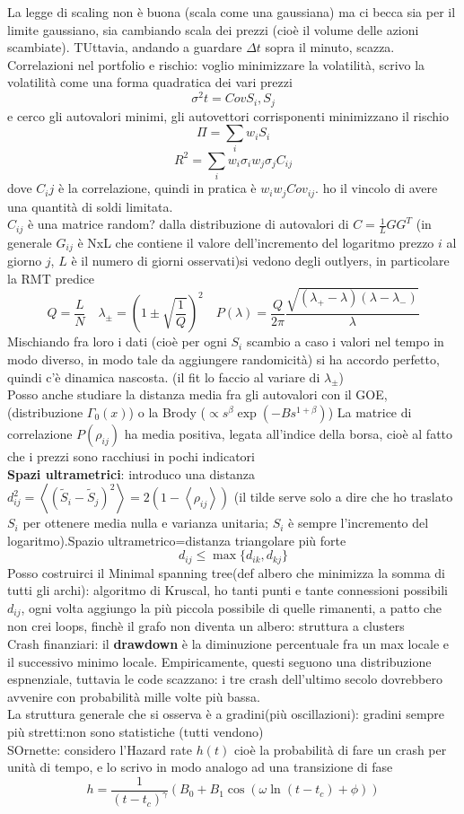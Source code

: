 \documentclass[a4paper,12pt]{article}
\theoremstyle{plain}
\theoremstyle{definition}
\newcommand{\f}[2]{\frac{#1}{#2}}
\newcommand{\ave}[1]{\left\langle#1\right\rangle }
\theoremstyle{remark}
\begin{document}
La legge di scaling non è buona  (scala come una gaussiana) ma ci becca sia per il limite gaussiano, sia cambiando scala dei prezzi (cioè il volume delle azioni scambiate). TUttavia, andando a guardare $\Delta t$ sopra il minuto, scazza.
\\Correlazioni nel portfolio e rischio: voglio minimizzare la volatilità, scrivo la volatilità come una forma quadratica dei vari prezzi
\[\sigma^2 t=Cov{S_i,S_j}\]
e cerco gli autovalori minimi, gli autovettori corrisponenti minimizzano il rischio
\[\Pi =\sum_i	w_i S_i		\] 
\[R^2=\sum_i	w_i \sigma_i w_j \sigma_j C_{ij}	\]
dove $C_ij$ è la correlazione, quindi in pratica è $w_i w_j Cov_{ij}$. ho il vincolo di avere una quantità di soldi limitata.\\ 
$C_{ij}$ è una matrice random? dalla distribuzione di autovalori di $C=\f{1}{L}G G^T$ (in generale $G_{ij}$ è NxL che contiene il valore dell'incremento del logaritmo prezzo $i$ al giorno $j$, $L$ è il numero di giorni osservati)si vedono degli outlyers, in particolare la RMT predice
\[Q=\f{L}{N}\quad\lambda_{\pm}=\left(1\pm\sqrt{\f{1}{Q}}\right)^2 \quad P(\lambda)=\f{Q}{2\pi}\f{\sqrt{(\lambda_{+}-\lambda)(\lambda-\lambda_-)}}{\lambda}			\]
Mischiando fra loro i dati (cioè per ogni $S_i$ scambio a caso i valori nel tempo in modo diverso, in modo tale da aggiungere randomicità) si ha accordo perfetto, quindi c'è dinamica nascosta. (il fit lo faccio al variare di $\lambda_\pm$)
\\Posso anche studiare la distanza media fra gli autovalori con il GOE, (distribuzione $\Gamma_0(x)$) o la Brody ($\propto s^\beta\exp(-Bs^{1+\beta})$)
La matrice di correlazione $P(\rho_{ij})$ ha media positiva, legata all'indice della borsa, cioè al fatto che i prezzi sono racchiusi in pochi indicatori
	\\\textbf{Spazi ultrametrici}: introduco una distanza $d_{ij}^2=\ave{(\tilde{S}_i-\tilde{S}_j)^2}=2(1-\ave{\rho_{ij}})$ (il tilde serve solo a dire che ho traslato $S_i$ per ottenere media nulla e varianza unitaria; $S_i$ è sempre l'incremento del logaritmo).Spazio ultrametrico=distanza triangolare più forte
		\[d_{ij}\le \max\{d_{ik},d_{kj}\}			\]
Posso costruirci il Minimal spanning tree(def albero che minimizza la somma di tutti gli archi): algoritmo di Kruscal, ho tanti punti e tante connessioni possibili $d_{ij}$, ogni volta aggiungo la più piccola possibile di quelle rimanenti, a patto che non crei loops, finchè il grafo non diventa un albero: struttura a clusters
\\Crash finanziari: il \textbf{drawdown } è la diminuzione percentuale fra un max locale e il successivo  minimo locale. Empiricamente, questi seguono una distribuzione espnenziale, tuttavia  le code scazzano: i tre crash dell'ultimo secolo dovrebbero avvenire con probabilità mille volte più bassa.\\La struttura generale che si osserva è a gradini(più oscillazioni): gradini sempre più stretti:non sono statistiche (tutti vendono)\\ SOrnette: considero l'Hazard rate $h(t)$ cioè la probabilità di fare un crash per unità di tempo, e lo scrivo in modo analogo ad una transizione di fase
\[h=\f{1}{(t-t_c)^\gamma}\left(B_0+B_1\cos(\omega\ln(t-t_c)+\phi)\right)\]
\end{document}
